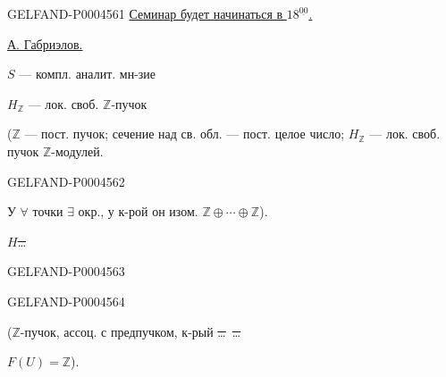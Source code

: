 \begin{GelfandAdjacentEvidence}{GELFAND-P000456}{1}
\underline{Семинар будет начинаться в \mbox{$18^{\underline{00}}$}.}

\qquad \underline{А. Габриэлов.}

$S$ — компл. аналит. мн-зие

$H_{\mathbb Z}$ — лок. своб. $\mathbb Z$-пучок

($\mathbb Z$ — пост. пучок; сечение над св. обл. — пост. целое число;
$H_{\mathbb Z}$ — лок. своб. пучок $\mathbb Z$-модулей.
\end{GelfandAdjacentEvidence}
\begin{GelfandAdjacentEvidence}{GELFAND-P000456}{2}

У $\forall$ точки $\exists$ окр.,
у к-рой он изом. $\mathbb Z\oplus\cdots\oplus\mathbb Z$).

\sout{\mbox{$H$}\ldots}\quad
{}
\end{GelfandAdjacentEvidence}
\begin{GelfandAdjacentEvidence}{GELFAND-P000456}{3}

\end{GelfandAdjacentEvidence}
\begin{GelfandAdjacentEvidence}{GELFAND-P000456}{4}

($\mathbb Z$-пучок, ассоц. с предпучком, к-рый \sout{\ldots}\ \sout{\ldots}
\par\noindent\hspace*{2em}$F(U)=\mathbb Z$).
\end{GelfandAdjacentEvidence}
